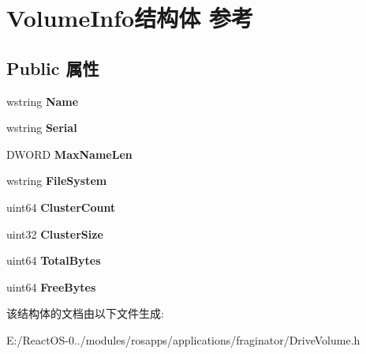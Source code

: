 \hypertarget{struct_volume_info}{}\section{Volume\+Info结构体 参考}
\label{struct_volume_info}
\subsection*{Public 属性}
\begin{DoxyCompactItemize}
\item 
\mbox{\label{struct_volume_info_a26bc24e7c89bd68daf9ebe6ade3a0322}} 
wstring {\bfseries Name}
\item 
\mbox{\label{struct_volume_info_a47eee1fa2b33b16205421043a17baf49}} 
wstring {\bfseries Serial}
\item 
\mbox{\label{struct_volume_info_a8e3e587cb05582e05f025025c7f87e98}} 
D\+W\+O\+RD {\bfseries Max\+Name\+Len}
\item 
\mbox{\label{struct_volume_info_ac253e6d6abef6606db85c6459949d477}} 
wstring {\bfseries File\+System}
\item 
\mbox{\label{struct_volume_info_aa0e82831effd33ae23fea3eca5e0074f}} 
uint64 {\bfseries Cluster\+Count}
\item 
\mbox{\label{struct_volume_info_ae5eb9367cc2c29c9f69624ae4bd59bfe}} 
uint32 {\bfseries Cluster\+Size}
\item 
\mbox{\label{struct_volume_info_a9c4c347c38ee685ef970167ebda36207}} 
uint64 {\bfseries Total\+Bytes}
\item 
\mbox{\label{struct_volume_info_aa8cfb405bac79c154b923ba2e138048b}} 
uint64 {\bfseries Free\+Bytes}
\end{DoxyCompactItemize}


该结构体的文档由以下文件生成\+:\begin{DoxyCompactItemize}
\item 
E\+:/\+React\+O\+S-\/0../modules/rosapps/applications/fraginator/Drive\+Volume.\+h\end{DoxyCompactItemize}

